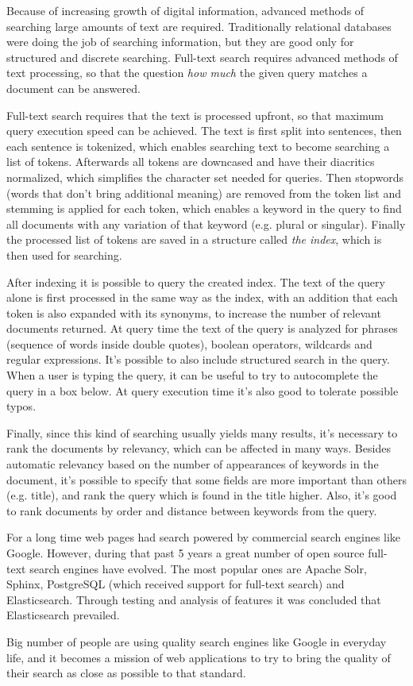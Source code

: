 \documentclass[a4paper,twoside,12pt]{scrreprt}
\begin{document}
\begin{summary}
  Because of increasing growth of digital information, advanced methods of searching large amounts of text are required. Traditionally relational databases were doing the job of searching information, but they are good only for structured and discrete searching. Full-text search requires advanced methods of text processing, so that the question \textit{how much} the given query matches a document can be answered.

  Full-text search requires that the text is processed upfront, so that maximum query execution speed can be achieved. The text is first split into sentences, then each sentence is tokenized, which enables searching text to become searching a list of tokens. Afterwards all tokens are downcased and have their diacritics normalized, which simplifies the character set needed for queries. Then stopwords (words that don't bring additional meaning) are removed from the token list and stemming is applied for each token, which enables a keyword in the query to find all documents with any variation of that keyword (e.g. plural or singular). Finally the processed list of tokens are saved in a structure called \textit{the index}, which is then used for searching.

  After indexing it is possible to query the created index. The text of the query alone is first processed in the same way as the index, with an addition that each token is also expanded with its synonyms, to increase the number of relevant documents returned. At query time the text of the query is analyzed for phrases (sequence of words inside double quotes), boolean operators, wildcards and regular expressions. It's possible to also include structured search in the query. When a user is typing the query, it can be useful to try to autocomplete the query in a box below. At query execution time it's also good to tolerate possible typos.

  Finally, since this kind of searching usually yields many results, it's necessary to rank the documents by relevancy, which can be affected in many ways. Besides automatic relevancy based on the number of appearances of keywords in the document, it's possible to specify that some fields are more important than others (e.g. title), and rank the query which is found in the title higher. Also, it's good to rank documents by order and distance between keywords from the query.

  For a long time web pages had search powered by commercial search engines like Google. However, during that past 5 years a great number of open source full-text search engines have evolved. The most popular ones are Apache Solr, Sphinx, PostgreSQL (which received support for full-text search) and Elasticsearch. Through testing and analysis of features it was concluded that Elasticsearch prevailed.

  Big number of people are using quality search engines like Google in everyday life, and it becomes a mission of web applications to try to bring the quality of their search as close as possible to that standard.
\end{summary}
\end{document}
